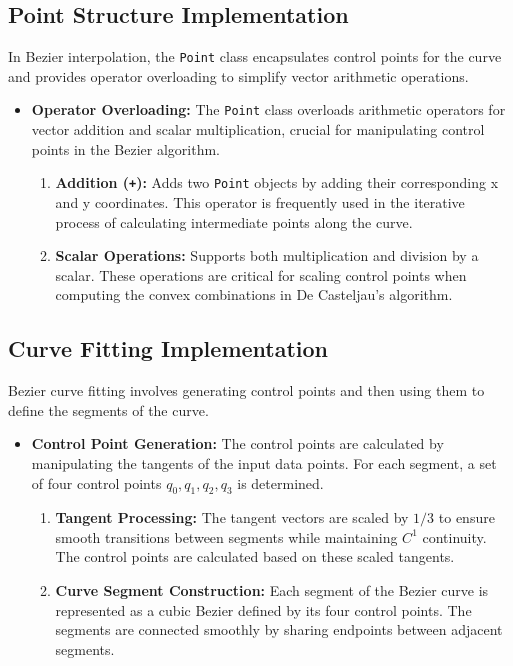 \documentclass{article}
\begin{document}
\subsection{Point Structure Implementation}
In Bezier interpolation, the \texttt{Point} class encapsulates control points for the curve and provides operator overloading to simplify vector arithmetic operations.

\begin{itemize}
    \item \textbf{Operator Overloading:}
    The \texttt{Point} class overloads arithmetic operators for vector addition and scalar multiplication, crucial for manipulating control points in the Bezier algorithm.
    \begin{enumerate}
        \item \textbf{Addition (\texttt{+}):} Adds two \texttt{Point} objects by adding their corresponding x and y coordinates. This operator is frequently used in the iterative process of calculating intermediate points along the curve.
        
        \item \textbf{Scalar Operations:} Supports both multiplication and division by a scalar. These operations are critical for scaling control points when computing the convex combinations in De Casteljau’s algorithm.
    \end{enumerate}
\end{itemize}

\subsection{Curve Fitting Implementation}
Bezier curve fitting involves generating control points and then using them to define the segments of the curve.

\begin{itemize}
    \item \textbf{Control Point Generation:}
    The control points are calculated by manipulating the tangents of the input data points. For each segment, a set of four control points \( q_0, q_1, q_2, q_3 \) is determined.
    \begin{enumerate}
        \item \textbf{Tangent Processing:} The tangent vectors are scaled by \(1/3\) to ensure smooth transitions between segments while maintaining \(C^1\) continuity. The control points are calculated based on these scaled tangents.
        
        \item \textbf{Curve Segment Construction:} Each segment of the Bezier curve is represented as a cubic Bezier defined by its four control points. The segments are connected smoothly by sharing endpoints between adjacent segments.
    \end{enumerate}
\end{itemize}
\end{document}
